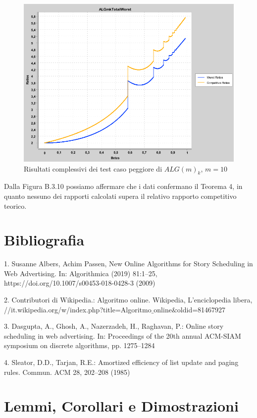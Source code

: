 \documentclass[12pt]{article}
\begin{document}
\begin{figure}[H]
\caption{Risultati complessivi dei test caso peggiore di $ALG(m)_{k}$, $m = 10$}
\centering
\includegraphics[scale=0.4]{worst/ALGmkTotalWorst.png}
\end{figure}
Dalla Figura B.3.10 possiamo affermare che i dati confermano il Teorema 4, in quanto nessuno dei rapporti calcolati supera il relativo rapporto competitivo teorico.
\section{Bibliografia}
1. Susanne Albers, Achim Passen, New Online Algorithms for Story Scheduling
in Web Advertising. In: Algorithmica (2019) 81:1–25, https://doi.org/10.1007/s00453-018-0428-3
(2009)
\begin{flushleft}
2. Contributori di Wikipedia.: Algoritmo online. Wikipedia, L'enciclopedia libera, //it.wikipedia.org/w/index.php?title=Algoritmo$\_$online$\&$oldid=81467927
\end{flushleft}
\begin{flushleft}
3. Dasgupta, A., Ghosh, A., Nazerzadeh, H., Raghavan, P.: Online story scheduling in web advertising.
In: Proceedings of the 20th annual ACM-SIAM symposium on discrete algorithms, pp. 1275–1284
\end{flushleft}
\begin{flushleft}
4. Sleator, D.D., Tarjan, R.E.: Amortized efficiency of list update and paging rules. Commun. ACM 28,
202–208 (1985)
\end{flushleft}
\appendix
\section{Lemmi, Corollari e Dimostrazioni}
\end{document}
